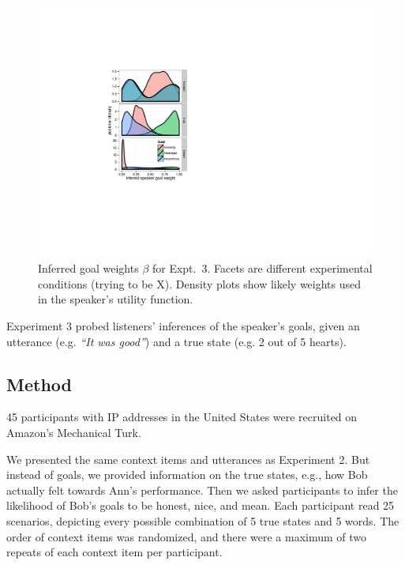 \documentclass[10pt,letterpaper]{article}
\begin{document}
\begin{figure}[!b] %
\begin{centering}
\includegraphics[width=0.70\columnwidth]{figures/goal-posterior.pdf}
\caption{\label{fig:goal-priors-bda} Inferred goal weights $\beta$ for Expt.~3.
Facets are different experimental conditions (trying to be X). 
Density plots show likely weights used in the speaker's utility function.
}
\end{centering}
\end{figure}



Experiment 3 probed listeners' inferences of the speaker's goals, given an utterance (e.g. \emph{``It was good''}) and a true state (e.g. 2 out of 5 hearts).

\subsection{Method}

45 participants with IP addresses in the United States were recruited on Amazon's Mechanical Turk.


We presented the same context items and utterances as Experiment 2.
But instead of goals, we provided information on the true states, e.g., how Bob actually felt towards Ann's performance.
Then we asked participants to infer the likelihood of Bob's goals to be honest, nice, and mean.
Each participant read 25 scenarios, depicting every possible combination of 5 true states and 5 words.
The order of context items was randomized, and there were a maximum of two repeats of each context item per participant.
\end{document}
